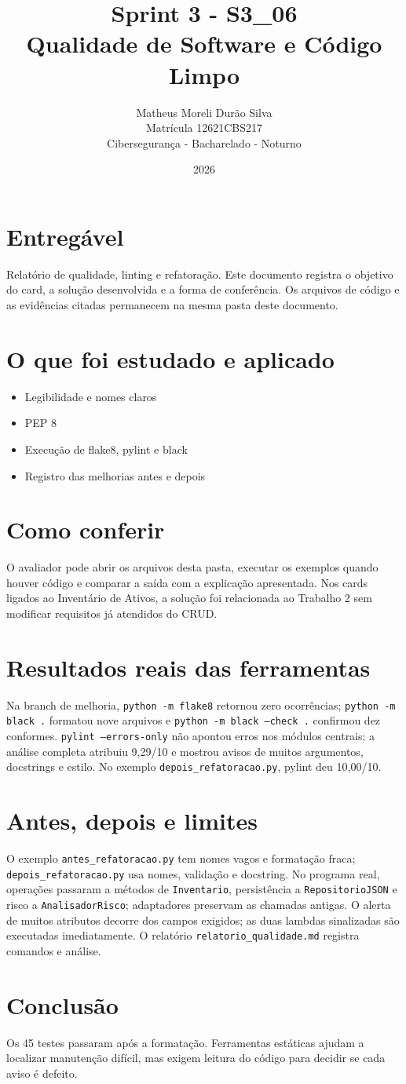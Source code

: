 \documentclass[12pt]{article}
\title{Sprint 3 - S3\_06\\Qualidade de Software e Código Limpo}
\author{Matheus Moreli Durão Silva\\Matrícula 12621CBS217\\Cibersegurança - Bacharelado - Noturno}
\date{2026}
\begin{document}
\maketitle

\section*{Entregável}
Relatório de qualidade, linting e refatoração. Este documento registra o objetivo do card, a solução desenvolvida e a forma de conferência. Os arquivos de código e as evidências citadas permanecem na mesma pasta deste documento.

\section*{O que foi estudado e aplicado}
\begin{itemize}
\item Legibilidade e nomes claros
\item PEP 8
\item Execução de flake8, pylint e black
\item Registro das melhorias antes e depois
\end{itemize}

\section*{Como conferir}
O avaliador pode abrir os arquivos desta pasta, executar os exemplos quando houver código e comparar a saída com a explicação apresentada. Nos cards ligados ao Inventário de Ativos, a solução foi relacionada ao Trabalho 2 sem modificar requisitos já atendidos do CRUD.

\section*{Resultados reais das ferramentas}
Na branch de melhoria, \texttt{python -m flake8} retornou zero ocorrências; \texttt{python -m black .} formatou nove arquivos e \texttt{python -m black --check .} confirmou dez conformes. \texttt{pylint --errors-only} não apontou erros nos módulos centrais; a análise completa atribuiu 9,29/10 e mostrou avisos de muitos argumentos, docstrings e estilo. No exemplo \texttt{depois\_refatoracao.py}, pylint deu 10,00/10.
\section*{Antes, depois e limites}
O exemplo \texttt{antes\_refatoracao.py} tem nomes vagos e formatação fraca; \texttt{depois\_refatoracao.py} usa nomes, validação e docstring. No programa real, operações passaram a métodos de \texttt{Inventario}, persistência a \texttt{RepositorioJSON} e risco a \texttt{AnalisadorRisco}; adaptadores preservam as chamadas antigas. O alerta de muitos atributos decorre dos campos exigidos; as duas lambdas sinalizadas são executadas imediatamente. O relatório \texttt{relatorio\_qualidade.md} registra comandos e análise.
\section*{Conclusão}
Os 45 testes passaram após a formatação. Ferramentas estáticas ajudam a localizar manutenção difícil, mas exigem leitura do código para decidir se cada aviso é defeito.
\end{document}
